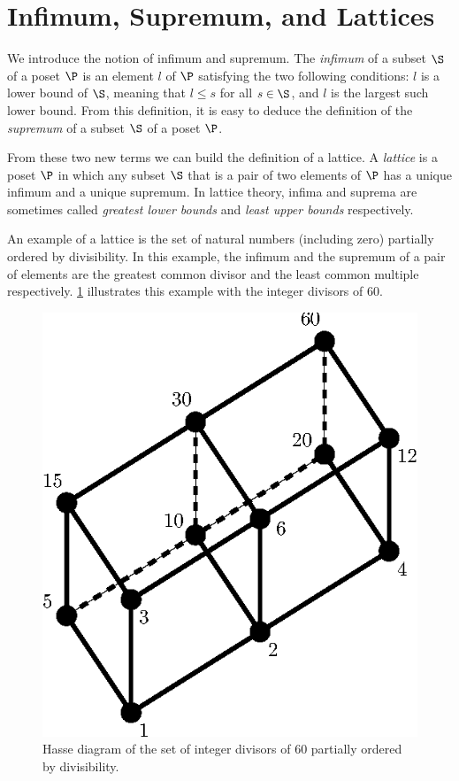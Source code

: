 \section{Infimum, Supremum, and Lattices}
\label{tree:poset:lattices}

We introduce the notion of infimum and supremum. The \emph{infimum} of a
subset \(\S\) of a poset \(\P\) is an element \(l\) of \(\P\) satisfying the two
following conditions: \(l\) is a lower bound of \(\S\), meaning that \(l \le
s\) for all \(s \in \S\), and \(l\) is the largest such lower bound. From this
definition, it is easy to deduce the definition of the \emph{supremum} of a subset
\(\S\) of a poset \(\P\).

From these two new terms we can build the definition of a lattice. A
\emph{lattice} is a poset \(\P\) in which any subset \(\S\) that is a pair of two
elements of \(\P\) has a unique infimum and a unique supremum. In lattice
theory, infima and suprema are sometimes called \emph{greatest lower bounds}
and \emph{least upper bounds} respectively.

An example of a lattice is the set of natural numbers (including zero)
partially ordered by divisibility. In this example, the infimum and the
supremum of a pair of elements are the greatest common divisor and the least
common multiple respectively. \ref{fig:poset:lattice:60div} illustrates this
example with the integer divisors of \(60\).

\begin{figure}
\center
\includegraphics[height=0.2\textheight]{fig/poset/lattice/60div}
\caption{Hasse diagram of the set of integer divisors of \(60\) partially ordered by
divisibility.}\label{fig:poset:lattice:60div}
\end{figure}
